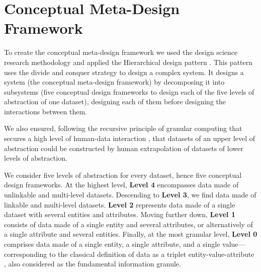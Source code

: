 \documentclass[12pt,a4paper]{article}
\begin{document}
\section{Conceptual Meta-Design Framework}
\label{sec:framework}

To create the conceptual meta-design framework we used the design science research methodology \citep{hevner2004} and applied the Hierarchical design pattern \citep{vaishnavi2015}. This pattern uses the divide and conquer strategy to design a complex system. It designs a system (the conceptual meta-design framework) by decomposing it into subsystems (five conceptual design frameworks to design each of the five levels of abstraction of one dataset), designing each of them before designing the interactions between them.

\vspace{1em}

\noindent We also ensured, following the recursive principle of granular computing that secures a high level of human-data interaction \citep{wilke2016}, that datasets of an upper level of abstraction could be constructed by human extrapolation of datasets of lower levels of abstraction.

\vspace{1em}

\noindent We consider five levels of abstraction for every dataset, hence five conceptual design frameworks. At the highest level, \textbf{Level 4} encompasses data made of unlinkable and multi-level datasets. Descending to \textbf{Level 3}, we find data made of linkable and multi-level datasets. \textbf{Level 2} represents data made of a single dataset with several entities and attributes. Moving further down, \textbf{Level 1} consists of data made of a single entity and several attributes, or alternatively of a single attribute and several entities. Finally, at the most granular level, \textbf{Level 0} comprises data made of a single entity, a single attribute, and a single value---corresponding to the classical definition of data as a triplet entity-value-attribute \citep{redman1997}, also considered as the fundamental information granule.
\end{document}
